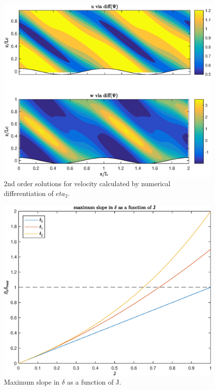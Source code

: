 \documentclass[12pt]{article}
\begin{document}
\begin{figure}
	\centering
	\includegraphics[width=1\textwidth]{vel_via_diff.eps}
	\caption{2nd order solutions for velocity calculated by numerical differentiation of $eta_2$.}
\end{figure}

\begin{figure}
	\centering
	\includegraphics[width=1\textwidth]{max_slopes.eps}
	\caption{Maximum slope in $\delta$ as a function of J.}
\end{figure}
\end{document}
